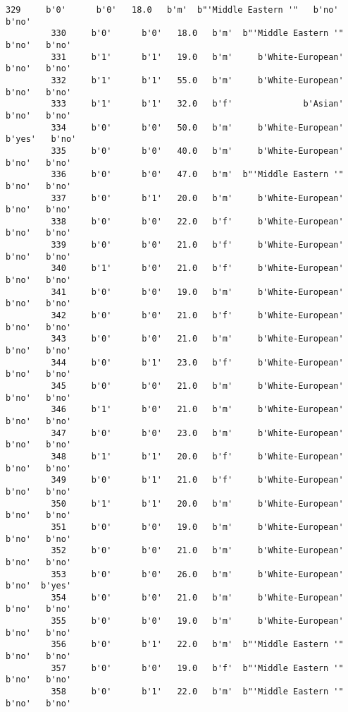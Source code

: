 \documentclass[11pt]{article}
\begin{document}
\begin{Verbatim}[commandchars=\\\{\}]
         329     b'0'      b'0'   18.0   b'm'  b"'Middle Eastern '"   b'no'   b'no'   
         330     b'0'      b'0'   18.0   b'm'  b"'Middle Eastern '"   b'no'   b'no'   
         331     b'1'      b'1'   19.0   b'm'     b'White-European'   b'no'   b'no'   
         332     b'1'      b'1'   55.0   b'm'     b'White-European'   b'no'   b'no'   
         333     b'1'      b'1'   32.0   b'f'              b'Asian'   b'no'   b'no'   
         334     b'0'      b'0'   50.0   b'm'     b'White-European'  b'yes'   b'no'   
         335     b'0'      b'0'   40.0   b'm'     b'White-European'   b'no'   b'no'   
         336     b'0'      b'0'   47.0   b'm'  b"'Middle Eastern '"   b'no'   b'no'   
         337     b'0'      b'1'   20.0   b'm'     b'White-European'   b'no'   b'no'   
         338     b'0'      b'0'   22.0   b'f'     b'White-European'   b'no'   b'no'   
         339     b'0'      b'0'   21.0   b'f'     b'White-European'   b'no'   b'no'   
         340     b'1'      b'0'   21.0   b'f'     b'White-European'   b'no'   b'no'   
         341     b'0'      b'0'   19.0   b'm'     b'White-European'   b'no'   b'no'   
         342     b'0'      b'0'   21.0   b'f'     b'White-European'   b'no'   b'no'   
         343     b'0'      b'0'   21.0   b'm'     b'White-European'   b'no'   b'no'   
         344     b'0'      b'1'   23.0   b'f'     b'White-European'   b'no'   b'no'   
         345     b'0'      b'0'   21.0   b'm'     b'White-European'   b'no'   b'no'   
         346     b'1'      b'0'   21.0   b'm'     b'White-European'   b'no'   b'no'   
         347     b'0'      b'0'   23.0   b'm'     b'White-European'   b'no'   b'no'   
         348     b'1'      b'1'   20.0   b'f'     b'White-European'   b'no'   b'no'   
         349     b'0'      b'1'   21.0   b'f'     b'White-European'   b'no'   b'no'   
         350     b'1'      b'1'   20.0   b'm'     b'White-European'   b'no'   b'no'   
         351     b'0'      b'0'   19.0   b'm'     b'White-European'   b'no'   b'no'   
         352     b'0'      b'0'   21.0   b'm'     b'White-European'   b'no'   b'no'   
         353     b'0'      b'0'   26.0   b'm'     b'White-European'   b'no'  b'yes'   
         354     b'0'      b'0'   21.0   b'm'     b'White-European'   b'no'   b'no'   
         355     b'0'      b'0'   19.0   b'm'     b'White-European'   b'no'   b'no'   
         356     b'0'      b'1'   22.0   b'm'  b"'Middle Eastern '"   b'no'   b'no'   
         357     b'0'      b'0'   19.0   b'f'  b"'Middle Eastern '"   b'no'   b'no'   
         358     b'0'      b'1'   22.0   b'm'  b"'Middle Eastern '"   b'no'   b'no'   

\end{Verbatim}
\end{document}

